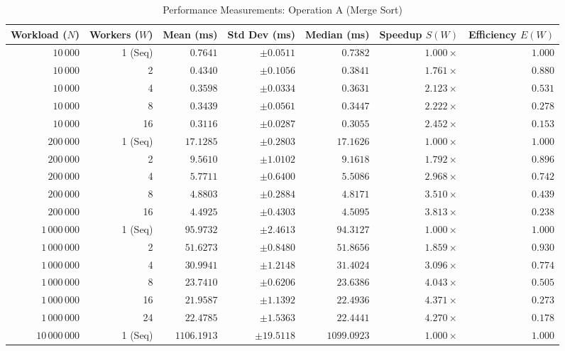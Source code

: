\documentclass[11pt]{article}
\begin{document}
\begin{table}[h!]
\centering
\scriptsize
\caption{Performance Measurements: Operation A (Merge Sort)}
\label{tab:sort_perf}
\begin{tabular}{r r r r r r r}
\toprule
\textbf{Workload ($N$)} & \textbf{Workers ($W$)} & \textbf{Mean (ms)} & \textbf{Std Dev (ms)} & \textbf{Median (ms)} & \textbf{Speedup $S(W)$} & \textbf{Efficiency $E(W)$} \\
\midrule
$10\,000$ & 1 (Seq) & $0.7641$ & $\pm 0.0511$ & $0.7382$ & $1.000\times$ & $1.000$ \\
$10\,000$ & 2       & $0.4340$ & $\pm 0.1056$ & $0.3841$ & $1.761\times$ & $0.880$ \\
$10\,000$ & 4       & $0.3598$ & $\pm 0.0334$ & $0.3631$ & $2.123\times$ & $0.531$ \\
$10\,000$ & 8       & $0.3439$ & $\pm 0.0561$ & $0.3447$ & $2.222\times$ & $0.278$ \\
$10\,000$ & 16      & $0.3116$ & $\pm 0.0287$ & $0.3055$ & $2.452\times$ & $0.153$ \\
\midrule
$200\,000$ & 1 (Seq) & $17.1285$ & $\pm 0.2803$ & $17.1626$ & $1.000\times$ & $1.000$ \\
$200\,000$ & 2       & $9.5610$  & $\pm 1.0102$ & $9.1618$  & $1.792\times$ & $0.896$ \\
$200\,000$ & 4       & $5.7711$  & $\pm 0.6400$ & $5.5086$  & $2.968\times$ & $0.742$ \\
$200\,000$ & 8       & $4.8803$  & $\pm 0.2884$ & $4.8171$  & $3.510\times$ & $0.439$ \\
$200\,000$ & 16      & $4.4925$  & $\pm 0.4303$ & $4.5095$  & $3.813\times$ & $0.238$ \\
\midrule
$1\,000\,000$ & 1 (Seq) & $95.9732$ & $\pm 2.4613$ & $94.3127$ & $1.000\times$ & $1.000$ \\
$1\,000\,000$ & 2       & $51.6273$ & $\pm 0.8480$ & $51.8656$ & $1.859\times$ & $0.930$ \\
$1\,000\,000$ & 4       & $30.9941$ & $\pm 1.2148$ & $31.4024$ & $3.096\times$ & $0.774$ \\
$1\,000\,000$ & 8       & $23.7410$ & $\pm 0.6206$ & $23.6386$ & $4.043\times$ & $0.505$ \\
$1\,000\,000$ & 16      & $21.9587$ & $\pm 1.1392$ & $22.4936$ & $\mathbf{4.371\times}$ & $0.273$ \\
$1\,000\,000$ & 24      & $22.4785$ & $\pm 1.5363$ & $22.4441$ & $4.270\times$ & $0.178$ \\
\midrule
$10\,000\,000$ & 1 (Seq) & $1106.1913$ & $\pm 19.5118$ & $1099.0923$ & $1.000\times$ & $1.000$ \\

\end{tabular}
\end{table}
\end{document}
